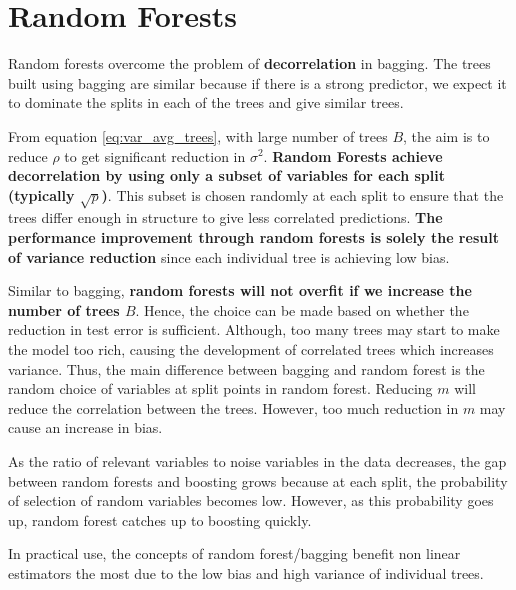 \documentclass[../statistical_learning_notes.tex]{subfiles}
\begin{document}
    \section{Random Forests}
    Random forests overcome the problem of \textbf{decorrelation} in bagging. The trees built using bagging are similar because if there is a strong predictor, we expect it to dominate the splits in each of the trees and give similar trees.\newline
    
    From equation \eqref{eq:var_avg_trees}, with large number of trees $B$, the aim is to reduce $\rho$ to get significant reduction in $\sigma^{2}$. \textbf{Random Forests achieve decorrelation by using only a subset of variables for each split (typically $\sqrt{p}$)}. This subset is chosen randomly at each split to ensure that the trees differ enough in structure to give less correlated predictions. \textbf{The performance improvement through random forests is solely the result of variance reduction} since each individual tree is achieving low bias.\newline

    Similar to bagging, \textbf{random forests will not overfit if we increase the number of trees $B$}. Hence, the choice can be made based on whether the reduction in test error is sufficient. Although, too many trees may start to make the model too rich, causing the development of correlated trees which increases variance. Thus, the main difference between bagging and random forest is the random choice of variables at split points in random forest. Reducing $m$ will reduce the correlation between the trees. However, too much reduction in $m$ may cause an increase in bias.\newline

    As the ratio of relevant variables to noise variables in the data decreases, the gap between random forests and boosting grows because at each split, the probability of selection of random variables becomes low. However, as this probability goes up, random forest catches up to boosting quickly.\newline

    In practical use, the concepts of random forest/bagging benefit non linear estimators the most due to the low bias and high variance of individual trees.
\end{document}
